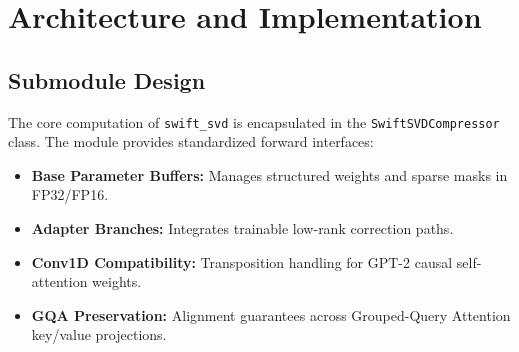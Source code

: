 \section{Architecture and Implementation}

\subsection{Submodule Design}
The core computation of \texttt{swift_svd} is encapsulated in the \texttt{SwiftSVDCompressor} class. The module provides standardized forward interfaces:
\begin{itemize}
\item \textbf{Base Parameter Buffers:} Manages structured weights and sparse masks in FP32/FP16.
\item \textbf{Adapter Branches:} Integrates trainable low-rank correction paths.
\item \textbf{Conv1D Compatibility:} Transposition handling for GPT-2 causal self-attention weights.
\item \textbf{GQA Preservation:} Alignment guarantees across Grouped-Query Attention key/value projections.
\end{itemize}

